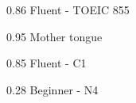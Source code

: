
        {0.86}
        {Fluent - TOEIC 855}
        {}{}{}

        {0.95}
        {Mother tongue}
        {}{}{}

        {0.85}
        {Fluent - C1}
        {}{}{}

        {0.28}
        {Beginner - N4}
        {}{}{}
